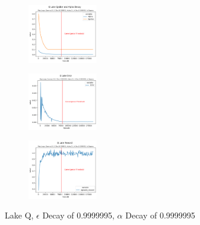 \documentclass[letterpaper]{article} %
\begin{document}
\begin{figure}[!htb]
	\centering
 	\begin{subfigure}[b]{0.175\textwidth}
		\includegraphics[width=1.2in]{Figures/Q_Lake_Epsilon_and_Alpha_Decay_Map_Large__Gamma_0_9__E_Dec_0_9999995__Alpha_0_1__A_Dec_0_9999995__Is_Slippery.png}
  	\end{subfigure}%
	 \begin{subfigure}[b]{0.175\textwidth}
		\includegraphics[width=1.2in]{Figures/Q_Lake_Error_Map_Large__Gamma_0_9__E_Dec_0_9999995__Alpha_0_1__A_Dec_0_9999995__Is_Slippery.png}
  	\end{subfigure}%
	\begin{subfigure}[b]{0.175\textwidth}
		\includegraphics[width=1.2in]{Figures/Q_Lake_Reward_Map_Large__Gamma_0_9__E_Dec_0_9999995__Alpha_0_1__A_Dec_0_9999995__Is_Slippery.png}
  	\end{subfigure}
\caption{Lake Q,  $\epsilon$ Decay of 0.9999995, $\alpha$ Decay of 0.9999995}
\label{fig:lake_q_e_9999995_a_9999995_rewards}
\end{figure}
\end{document}
